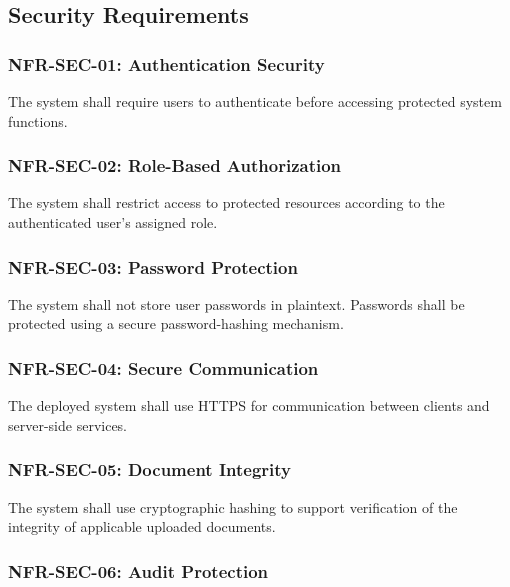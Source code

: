 
\subsection{Security Requirements}

\subsubsection{NFR-SEC-01: Authentication Security}

The system shall require users to authenticate before accessing protected
system functions.

\subsubsection{NFR-SEC-02: Role-Based Authorization}

The system shall restrict access to protected resources according to the
authenticated user's assigned role.

\subsubsection{NFR-SEC-03: Password Protection}

The system shall not store user passwords in plaintext. Passwords shall be
protected using a secure password-hashing mechanism.

\subsubsection{NFR-SEC-04: Secure Communication}

The deployed system shall use HTTPS for communication between clients and
server-side services.

\subsubsection{NFR-SEC-05: Document Integrity}

The system shall use cryptographic hashing to support verification of the
integrity of applicable uploaded documents.

\subsubsection{NFR-SEC-06: Audit Protection}

